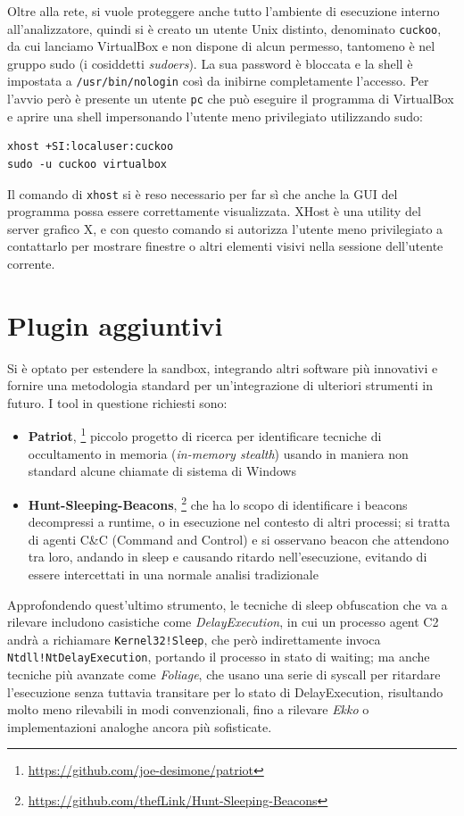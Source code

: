 Oltre alla rete, si vuole proteggere anche tutto l'ambiente di esecuzione interno all'analizzatore, quindi si è creato un utente Unix distinto, denominato \texttt{cuckoo}, da cui lanciamo VirtualBox e non dispone di alcun permesso, tantomeno è nel gruppo sudo (i cosiddetti \emph{sudoers}). La sua password è bloccata e la shell è impostata a \texttt{/usr/bin/nologin} così da inibirne completamente l'accesso.
Per l'avvio però è presente un utente \texttt{pc} che può eseguire il programma di VirtualBox e aprire una shell impersonando l'utente meno privilegiato utilizzando sudo:
\begin{verbatim}
xhost +SI:localuser:cuckoo
sudo -u cuckoo virtualbox
\end{verbatim}
Il comando di \texttt{xhost} si è reso necessario per far sì che anche la GUI del programma possa essere correttamente visualizzata. XHost è una utility del server grafico X, e con questo comando si autorizza l'utente meno privilegiato a contattarlo per mostrare finestre o altri elementi visivi nella sessione dell'utente corrente.

\section{Plugin aggiuntivi}
Si è optato per estendere la sandbox, integrando altri software più innovativi e fornire una metodologia standard per un'integrazione di ulteriori strumenti in futuro.
I tool in questione richiesti sono:
\begin{itemize}
    \item \textbf{Patriot},
    \footnote{\url{https://github.com/joe-desimone/patriot}}
    piccolo progetto di ricerca per identificare tecniche di occultamento in memoria (\emph{in-memory stealth}) usando in maniera non standard alcune chiamate di sistema di Windows
    \item \textbf{Hunt-Sleeping-Beacons},
    \footnote{\url{https://github.com/thefLink/Hunt-Sleeping-Beacons}}
    che ha lo scopo di identificare i beacons decompressi a runtime, o in esecuzione nel contesto di altri processi; si tratta di agenti C\&C (Command and Control) e si osservano beacon che attendono tra loro, andando in sleep e causando ritardo nell'esecuzione, evitando di essere intercettati in una normale analisi tradizionale
\end{itemize}

Approfondendo quest'ultimo strumento, le tecniche di sleep obfuscation che va a rilevare includono casistiche come \emph{DelayExecution}, in cui un processo agent C2 andrà a richiamare \texttt{Kernel32!Sleep}, che però indirettamente invoca \texttt{Ntdll!NtDelayExecution}, portando il processo in stato di waiting;
ma anche tecniche più avanzate come \emph{Foliage}, che usano una serie di syscall per ritardare l'esecuzione senza tuttavia transitare per lo stato di DelayExecution, risultando molto meno rilevabili in modi convenzionali, fino a rilevare \emph{Ekko} o implementazioni analoghe ancora più sofisticate.

